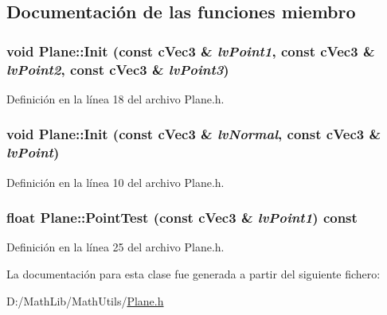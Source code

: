 \subsection{Documentación de las funciones miembro}
\hypertarget{class_plane_a56118cdc77778a635a2ad09a95924f5f}{
\subsubsection[{Init}]{\setlength{\rightskip}{0pt plus 5cm}void Plane::Init (const {\bf cVec3} \& {\em lvPoint1}, \/  const {\bf cVec3} \& {\em lvPoint2}, \/  const {\bf cVec3} \& {\em lvPoint3})}}
\label{class_plane_a56118cdc77778a635a2ad09a95924f5f}


Definición en la línea 18 del archivo Plane.h.

\hypertarget{class_plane_a5a04a950b7774c49cbc786680653dd9b}{
\subsubsection[{Init}]{\setlength{\rightskip}{0pt plus 5cm}void Plane::Init (const {\bf cVec3} \& {\em lvNormal}, \/  const {\bf cVec3} \& {\em lvPoint})}}
\label{class_plane_a5a04a950b7774c49cbc786680653dd9b}


Definición en la línea 10 del archivo Plane.h.

\hypertarget{class_plane_a253f2b49f805d05dfc79569e1da0c021}{
\subsubsection[{PointTest}]{\setlength{\rightskip}{0pt plus 5cm}float Plane::PointTest (const {\bf cVec3} \& {\em lvPoint1}) const}}
\label{class_plane_a253f2b49f805d05dfc79569e1da0c021}


Definición en la línea 25 del archivo Plane.h.



La documentación para esta clase fue generada a partir del siguiente fichero:\begin{DoxyCompactItemize}
\item 
D:/MathLib/MathUtils/\hyperlink{_plane_8h}{Plane.h}\end{DoxyCompactItemize}
